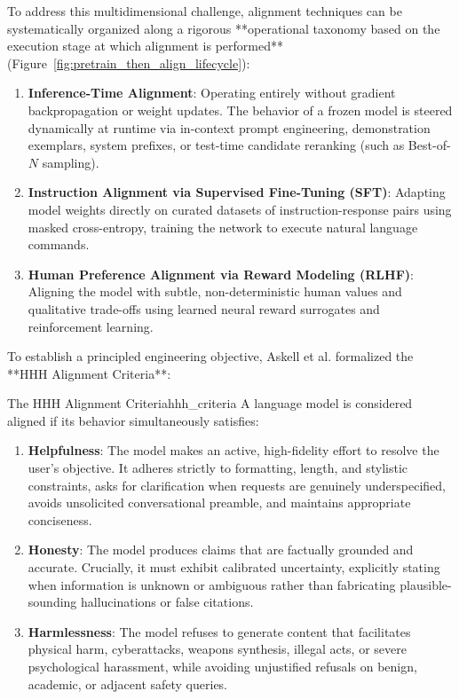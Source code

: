 \documentclass[../../main.tex]{subfiles}
\begin{document}
To address this multidimensional challenge, alignment techniques can be systematically organized along a rigorous **operational taxonomy based on the execution stage at which alignment is performed** (Figure~\ref{fig:pretrain_then_align_lifecycle}):
\begin{enumerate}
    \item \textbf{Inference-Time Alignment}: Operating entirely without gradient backpropagation or weight updates. The behavior of a frozen model is steered dynamically at runtime via in-context prompt engineering, demonstration exemplars, system prefixes, or test-time candidate reranking (such as Best-of-$N$ sampling).
    \item \textbf{Instruction Alignment via Supervised Fine-Tuning (SFT)}: Adapting model weights directly on curated datasets of instruction-response pairs using masked cross-entropy, training the network to execute natural language commands.
    \item \textbf{Human Preference Alignment via Reward Modeling (RLHF)}: Aligning the model with subtle, non-deterministic human values and qualitative trade-offs using learned neural reward surrogates and reinforcement learning.
\end{enumerate}

To establish a principled engineering objective, Askell et al. \citep{askell2021} formalized the **HHH Alignment Criteria**:
\begin{definition}{The HHH Alignment Criteria}{hhh_criteria}
A language model is considered aligned if its behavior simultaneously satisfies:
\begin{enumerate}
    \item \textbf{Helpfulness}: The model makes an active, high-fidelity effort to resolve the user's objective. It adheres strictly to formatting, length, and stylistic constraints, asks for clarification when requests are genuinely underspecified, avoids unsolicited conversational preamble, and maintains appropriate conciseness.
    \item \textbf{Honesty}: The model produces claims that are factually grounded and accurate. Crucially, it must exhibit calibrated uncertainty, explicitly stating when information is unknown or ambiguous rather than fabricating plausible-sounding hallucinations or false citations.
    \item \textbf{Harmlessness}: The model refuses to generate content that facilitates physical harm, cyberattacks, weapons synthesis, illegal acts, or severe psychological harassment, while avoiding unjustified refusals on benign, academic, or adjacent safety queries.
\end{enumerate}
\end{definition}
\end{document}
